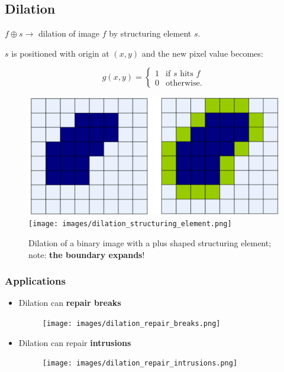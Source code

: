 \subsection*{Dilation}

$f \oplus s \rightarrow$ dilation of image $f$ by structuring element $s$.

$s$ is positioned with origin at $(x, y)$ and the new pixel value becomes:

\begin{equation*}
  g(x, y) =
  \begin{cases}
    1 & \text{if } s \text{ hits } f\\
    0 & \text{otherwise}.
  \end{cases}
\end{equation*}

\begin{figure}[H]
  \centering
  \includegraphics[width=\linewidth]{images/dilation.png}
  \texttt{[image: images/dilation\_structuring\_element.png]}
  \caption{Dilation of a binary image with a plus shaped structuring
  element; note: \textbf{the boundary expands}!}
\end{figure}

\subsubsection*{Applications}

\begin{itemize}
  \item Dilation can \textbf{repair breaks}

    \begin{minipage}{\linewidth}
      \begin{figure}[H]
        \centering
        \texttt{[image: images/dilation\_repair\_breaks.png]}
      \end{figure}
    \end{minipage}

  \item Dilation can repair \textbf{intrusions}

    \begin{minipage}{\linewidth}
      \begin{figure}[H]
        \centering
        \texttt{[image: images/dilation\_repair\_intrusions.png]}
      \end{figure}
    \end{minipage}
\end{itemize}

